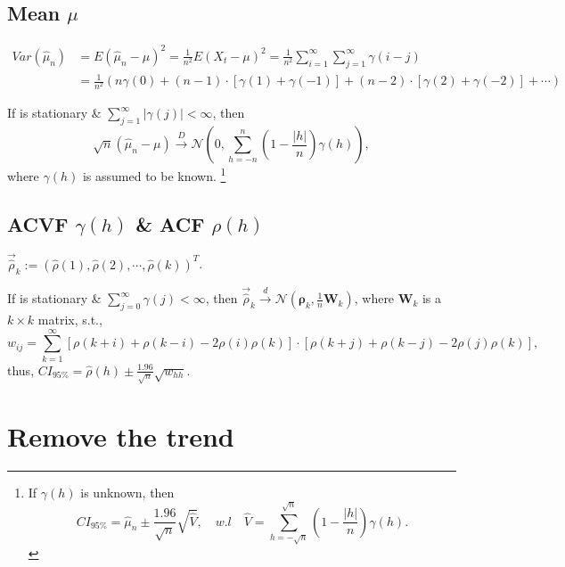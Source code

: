 \subsection{Mean $\mu$}

\begin{align*}
    Var(\hat{\mu}_n) &= E(\hat{\mu}_n - \mu)^2 = \frac{1}{n^2} E(X_t - \mu)^2 = \frac{1}{n^2} \sum_{i = 1}^{\infty} \sum_{j = 1}^{\infty} \gamma(i-j)\\
    &= \frac{1}{n^2} (n\gamma(0) + (n-1)\cdot[\gamma(1) + \gamma(-1)] + (n-2)\cdot [\gamma(2) + \gamma(-2)]+ \cdots)
\end{align*}

\begin{theorem}
If  is stationary \& $\sum_{j = 1}^{\infty} |\gamma(j)|< \infty$, then 
\[
    \sqrt{n}(\hat{\mu}_n - \mu) \overset{D}{\rightarrow} \mathcal{N}(0, \sum_{h = -n}^{n} (1 - \frac{|h|}{n}) \gamma(h)),
\]
where $\gamma(h)$ is assumed to be known.
\footnote{If $\gamma(h)$ is unknown, then 
\[
    CI_{95\%} = \hat{\mu}_n \pm \frac{1.96}{\sqrt{n}} \sqrt{\hat{V}}, \quad w.l \quad \hat{V} = \sum_{h = -\sqrt{n}}^{\sqrt{n}} (1 - \frac{|h|}{n}) \hat{\gamma}(h).
\]}
\end{theorem}

\subsection{ACVF $\gamma(h)$ \& ACF $\rho(h)$}

$\Vec{\hat{\rho}}_k := (\hat{\rho}(1),\hat{\rho}(2), \cdots, \hat{\rho}(k))^T$.

\begin{theorem}
If  is stationary \& $\sum_{j = 0}^{\infty} \gamma(j) < \infty$, then $\Vec{\hat{\rho}}_k \overset{d}{\rightarrow} \mathcal{N} (\bm{\rho}_k, \frac{1}{n} \bm{W}_k)$, where  $\bm{W}_k$ is a $k\times k$ matrix, s.t., 
\[
    w_{ij} = \sum_{k = 1}^{\infty} [\rho(k+i) + \rho(k-i) - 2\rho(i)\rho(k)] \cdot [\rho(k+j) + \rho(k-j) - 2\rho(j)\rho(k)],
\]
thus, $CI_{95\%} = \hat{\rho}(h) \pm \frac{1.96}{\sqrt{n}} \sqrt{w_{hh}}$.
\end{theorem}

\section{Remove the trend}

